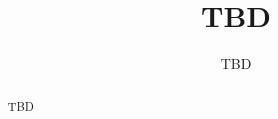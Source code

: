 \documentclass{article}
\title{TBD}
\author{TBD}
\date{}
\begin{document}
\maketitle

\begin{abstract}
TBD
\end{abstract}











\end{document}
